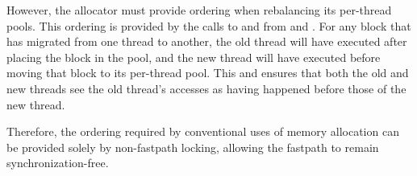 However, the allocator must provide ordering when rebalancing its
per-thread pools.
This ordering is provided by the calls to  and
 from  and .
For any block that has migrated from one thread to another, the old
thread will have executed  after
placing the block in the  pool, and the new thread will
have executed  before moving that
block to its per-thread pool.
This  and  ensures that both the
old and new threads see the old thread's accesses as having happened
before those of the new thread.

\QuickQuizEnd

Therefore, the ordering required by conventional uses of memory allocation
can be provided solely by non-fastpath locking, allowing the fastpath to
remain synchronization-free.





